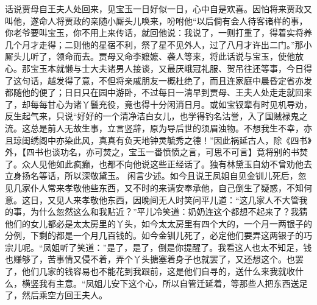 \documentclass[12pt,oneside]{book}
\begin{document}
话说贾母自王夫人处回来，见宝玉一日好似一日，心中自是欢喜。因怕将来贾政又叫他，遂命人将贾政的亲随小厮头儿唤来，吩咐他“以后倘有会人待客诸样的事，你老爷要叫宝玉，你不用上来传话，就回他说：我说了，一则打重了，得着实将养几个月才走得；二则他的星宿不利，祭了星不见外人，过了八月才许出二门。”那小厮头儿听了，领命而去。贾母又命李嬷嬷、袭人等来，将此话说与宝玉，使他放心。那宝玉本就懒与士大夫诸男人接谈，又最厌峨冠礼服、贺吊往还等事，今日得了这句话，越发得了意，不但将亲戚朋友一概杜绝了，而且连家庭中晨昏定省亦发都随他的便了；日日只在园中游卧，不过每日一清早到贾母、王夫人处走走就回来了，却每每甘心为诸丫鬟充役，竟也得十分闲消日月。或如宝钗辈有时见机导劝，反生起气来，只说“好好的一个清净洁白女儿，也学得钓名沽誉，入了国贼禄鬼之流。这总是前人无故生事，立言竖辞，原为导后世的须眉浊物。不想我生不幸，亦且琼闺绣阁中亦染此风，真真有负天地钟灵毓秀之德！”因此祸延古人，除《四书》外，【四书也谈功名，亦可焚之，宝玉一番愤愤之言，可思不可言】竟将别的书焚了。众人见他如此疯癫，也都不向他说这些正经话了。独有林黛玉自幼不曾劝他去立身扬名等话，所以深敬黛玉。
闲言少述。如今且说王凤姐自见金钏儿死后，忽见几家仆人常来孝敬他些东西，又不时的来请安奉承他，自己倒生了疑惑，不知何意。这日，又见人来孝敬他东西，因晚间无人时笑问平儿道：“这几家人不大管我的事，为什么忽然这么和我贴近？”平儿冷笑道：奶奶连这个都想不起来了？我猜他们的女儿都必是太太房里的丫头，如今太太房里有四个大的，一个月一两银子的分例，下剩的都是一个月几百钱的。如今金钏儿死了，必定他们要弄这两银子的巧宗儿呢。“凤姐听了笑道：”是了，是了，倒是你提醒了。我看这人也太不知足，钱也赚够了，苦事情又侵不着，弄个丫头搪塞着身子也就罢了，又还想这个。也罢了，他们几家的钱容易也不能花到我跟前，这是他们自寻的，送什么来我就收什么，横竖我有主意。“凤姐儿安下这个心，所以自管迁延着，等那些人把东西送足了，然后乘空方回王夫人。
\end{document}
